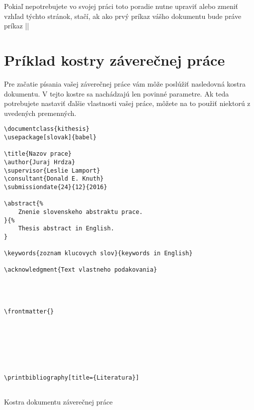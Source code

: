 Pokiaľ nepotrebujete vo svojej práci toto poradie nutne upraviť alebo zmeniť vzhľad týchto stránok, stačí, ak ako prvý príkaz vášho dokumentu bude práve príkaz |\frontmatter|


\section{Príklad kostry záverečnej práce}

Pre začatie písania vašej záverečnej práce vám môže poslúžiť nasledovná kostra dokumentu. V tejto kostre sa nachádzajú len povinné parametre. Ak teda potrebujete nastaviť ďalšie vlastnosti vašej práce, môžete na to použiť niektorú z uvedených premenných.


\begin{listing}[ht!]
\begin{verbatim}
\documentclass{kithesis}
\usepackage[slovak]{babel}

\title{Nazov prace}
\author{Juraj Hrdza}
\supervisor{Leslie Lamport}
\consultant{Donald E. Knuth}
\submissiondate{24}{12}{2016}

\abstract{%
    Znenie slovenskeho abstraktu prace.
}{%
    Thesis abstract in English.
}

\keywords{zoznam klucovych slov}{keywords in English}

\acknowledgment{Text vlastneho podakovania}




\frontmatter{}







\printbibliography[title={Literatura}]


\end{verbatim}
\caption{Kostra dokumentu záverečnej práce}
\end{listing}

